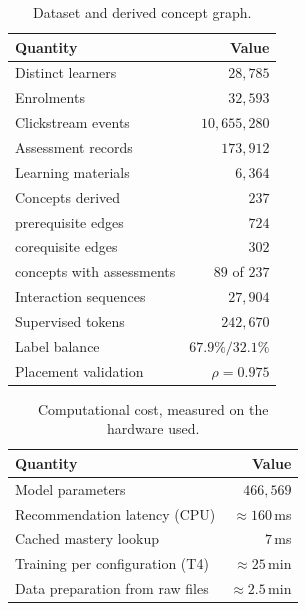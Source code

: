 \documentclass[conference]{IEEEtran}
\begin{document}
\begin{table}[t]
\centering
\caption{Dataset and derived concept graph.}
\label{tab:dataset}
\begin{tabular}{lr}
\toprule
Quantity & Value \\
\midrule
Distinct learners               & $28{,}785$ \\
Enrolments                      & $32{,}593$ \\
Clickstream events              & $10{,}655{,}280$ \\
Assessment records              & $173{,}912$ \\
Learning materials              & $6{,}364$ \\
\midrule
Concepts derived                & $237$ \\
\quad prerequisite edges        & $724$ \\
\quad corequisite edges         & $302$ \\
\quad concepts with assessments & $89$ of $237$ \\
\midrule
Interaction sequences           & $27{,}904$ \\
Supervised tokens               & $242{,}670$ \\
Label balance                   & $67.9\% / 32.1\%$ \\
Placement validation            & $\rho = 0.975$ \\
\bottomrule
\end{tabular}
\end{table}

\begin{table}[t]
\centering
\caption{Computational cost, measured on the hardware used.}
\label{tab:efficiency}
\begin{tabular}{lr}
\toprule
Quantity & Value \\
\midrule
Model parameters                  & $466{,}569$ \\
Recommendation latency (CPU)      & ${\approx}160$\,ms \\
Cached mastery lookup             & $7$\,ms \\
Training per configuration (T4)   & ${\approx}25$\,min \\
Data preparation from raw files   & ${\approx}2.5$\,min \\
\bottomrule
\end{tabular}
\end{table}
\end{document}
